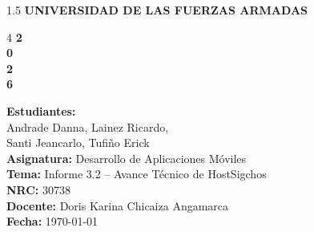 \documentclass{article}
\begin{document}
\begin{titlepage}
\thispagestyle{empty}
\begin{spacing}{1.5}
{\huge \bfseries UNIVERSIDAD DE LAS FUERZAS ARMADAS}\\[10pt]
\centering
\end{spacing}
\vspace{1cm}
\begin{minipage}{2cm}
\hspace{0.5cm}
\end{minipage}\hfill
\begin{minipage}{9cm}
\end{minipage}\hfill
\begin{minipage}{3cm}
\hspace{1cm}
\vspace{1.cm}
\begin{spacing}{4}
 {\color{white}\fontsize{60}{70}\selectfont\bfseries 2\\0\\2\\6}
\end{spacing}
\end{minipage}

\vspace{4cm}
\begin{flushleft}
{\LARGE
\textbf{Estudiantes:}\\
\hspace{1cm} Andrade Danna, Lainez Ricardo, \\
\hspace{1cm} Santi Jeancarlo, Tufiño Erick\\[10pt]
\textbf{Asignatura:} Desarrollo de Aplicaciones Móviles\\
\textbf{Tema:} Informe 3.2 -- Avance Técnico de HostSigchos\\
\textbf{NRC:} 30738\\
\textbf{Docente:} Doris Karina Chicaiza Angamarca\\
\textbf{Fecha:} \today\\}
\end{flushleft}
\end{titlepage}
\restoregeometry
\newpage
\end{document}
